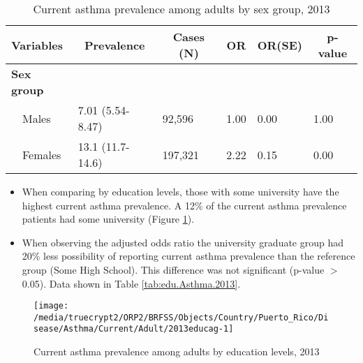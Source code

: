 \begin{table}[H]
\caption{Current asthma prevalence  among adults by sex group, 2013\label{tab:sex.Asthma.2013}} 
\begin{center}
\begin{tabular}{llllll}
\hline\hline
\multicolumn{1}{l}{Variables}&\multicolumn{1}{c}{Prevalence}&\multicolumn{1}{c}{Cases (N)}&\multicolumn{1}{c}{OR}&\multicolumn{1}{c}{OR(SE)}&\multicolumn{1}{c}{p-value}\tabularnewline
\hline
{\bfseries Sex group}&&&&&\tabularnewline
~~Males&7.01 (5.54-8.47)& 92,596&1.00&0.00&1.00\tabularnewline
~~Females&13.1 (11.7-14.6)&197,321&2.22&0.15&0.00\tabularnewline
\hline
\end{tabular}\end{center}

\end{table}


\newpage
\begin{itemize}

\item When comparing by education levels, those with
some university
have the highest current asthma prevalence. A 12\% of the current asthma prevalence patients had some university
(Figure \ref{fig:edu.Asthma.2013}).

\item 
When observing the adjusted odds ratio the university graduate group had 20\% less possibility of reporting current asthma prevalence than the reference group (Some High School).
This difference was not significant (p-value $>$ 0.05).  Data shown in Table \ref{tab:edu.Asthma.2013}.

\end{itemize}

\begin{figure}[H]
\caption{Current asthma prevalence among adults by education levels, 
         2013}
\begin{knitrout}
\color{fgcolor}

{\centering \texttt{[image: /media/truecrypt2/ORP2/BRFSS/Objects/Country/Puerto\_Rico/Disease/Asthma/Current/Adult/2013educag-1]} 

}



\end{knitrout}
 \label{fig:edu.Asthma.2013}
\end{figure}


